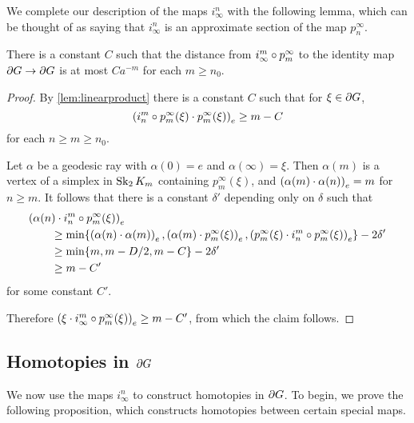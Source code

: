 \documentclass[a4paper]{article}
\begin{document}
We complete our description of the maps $i^n_\infty$ with the following lemma,
which can be thought of as saying that $i^n_\infty$ is an approximate section
of the map $p^\infty_n$.

\begin{lemma}\label{lem:convergestoidentity}
  There is a constant $C$ such that the distance from $i^m_\infty \composed 
  p^\infty_m$ to the identity map $\boundary G\to\boundary G$ is at most 
  $Ca^{-m}$ for each $m \geq n_0$.
\end{lemma}

\begin{proof}
  By \cref{lem:linearproduct} there is a constant $C$ such that  for $\xi \in
  \boundary G$,
  \begin{equation*}
    \gromov{e}{i^m_n\composed p^\infty_m(\xi)}{p^\infty_m(\xi)} \geq m - C
  \end{equation*} 
  for each $n\geq m\geq n_0$. 

  Let $\alpha$ be a geodesic ray with $\alpha(0) = e$ and $\alpha(\infty) = 
  \xi$. Then $\alpha(m)$ is a vertex of a simplex in $\Skel_2K_m$ containing 
  $p^\infty_m(\xi)$, and $\gromov{e}{\alpha(m)}{\alpha(n)} = m$ for $n\geq m$.
  It follows that there is a constant $\delta'$ depending only on $\delta$ such 
  that
  \begin{align*}
    \mathrlap{\gromov{e}{\alpha(n)}{i^m_n\composed p^\infty_m(\xi)}}\quad\quad &\\
          & \geq \min\{\gromov{e}{\alpha(n)}{\alpha(m)}, 
            \gromov{e}{\alpha(m)}{p^\infty_m(\xi)}, 
            \gromov{e}{p^\infty_m(\xi)}{i^m_n\composed p^\infty_m(\xi)}\} 
            - 2\delta' \\
          &\geq \min\{m, m - D/2, m - C\} - 2\delta' \\
          &\geq m - C'
  \end{align*}
  for some constant $C'$.

  Therefore $\gromov{e}{\xi}{i^m_\infty\composed p^\infty_m(\xi)} \geq m - C'$, 
  from which the claim follows.
\end{proof}

\subsection{Homotopies in $\boundary G$}

We now use the maps $i^n_\infty$ to construct homotopies in $\boundary G$. To
begin, we prove the following proposition, which constructs homotopies between
certain special maps.
\end{document}
